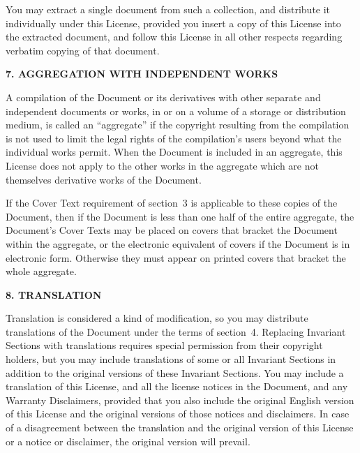 \documentclass[10pt,a4paper,ngerman,titlepage,tocindentauto]{article}
\begin{document}
\begin{multicols}{3}
{					You may extract a single document from such a collection, and distribute
					it individually under this License, provided you insert a copy of this
					License into the extracted document, and follow this License in all
					other respects regarding verbatim copying of that document.


					\begin{center}
					{\bf 7. AGGREGATION WITH INDEPENDENT WORKS\par}
					\end{center}

					A compilation of the Document or its derivatives with other separate
					and independent documents or works, in or on a volume of a storage or
					distribution medium, is called an ``aggregate'' if the copyright
					resulting from the compilation is not used to limit the legal rights
					of the compilation's users beyond what the individual works permit.
					When the Document is included in an aggregate, this License does not
					apply to the other works in the aggregate which are not themselves
					derivative works of the Document.

					If the Cover Text requirement of section~3 is applicable to these
					copies of the Document, then if the Document is less than one half of
					the entire aggregate, the Document's Cover Texts may be placed on
					covers that bracket the Document within the aggregate, or the
					electronic equivalent of covers if the Document is in electronic form.
					Otherwise they must appear on printed covers that bracket the whole
					aggregate.


					\begin{center}
					{\bf 8. TRANSLATION\par}
					\end{center}

					Translation is considered a kind of modification, so you may
					distribute translations of the Document under the terms of section~4.
					Replacing Invariant Sections with translations requires special
					permission from their copyright holders, but you may include
					translations of some or all Invariant Sections in addition to the
					original versions of these Invariant Sections.  You may include a
					translation of this License, and all the license notices in the
					Document, and any Warranty Disclaimers, provided that you also include
					the original English version of this License and the original versions
					of those notices and disclaimers.  In case of a disagreement between
					the translation and the original version of this License or a notice
					or disclaimer, the original version will prevail.

}
\end{multicols}
\end{document}

